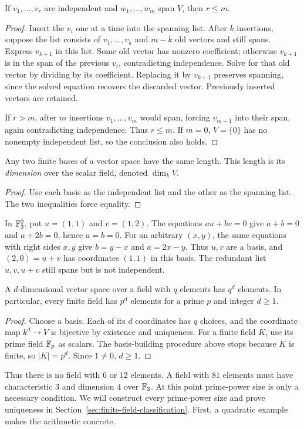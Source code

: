 \begin{lemma}[Exchange]
If $v_1,\ldots,v_r$ are independent and $w_1,\ldots,w_m$ span $V$,
then $r\le m$.
\end{lemma}
\begin{proof}
Insert the $v_i$ one at a time into the spanning list. After $k$
insertions, suppose the list consists of $v_1,\ldots,v_k$ and $m-k$
old vectors and still spans. Express $v_{k+1}$ in this list. Some old
vector has nonzero coefficient; otherwise $v_{k+1}$ is in the span of
the previous $v_i$, contradicting independence. Solve for that old
vector by dividing by its coefficient. Replacing it by $v_{k+1}$
preserves spanning, since the solved equation recovers the discarded
vector. Previously inserted vectors are retained.

If $r>m$, after $m$ insertions $v_1,\ldots,v_m$ would span, forcing
$v_{m+1}$ into their span, again contradicting independence. Thus
$r\le m$. If $m=0$, $V=\{0\}$ has no nonempty independent list,
so the conclusion also holds.
\end{proof}

\begin{corollary}
Any two finite bases of a vector space have the same length. This length
is its \emph{dimension} over the scalar field, denoted $\dim_kV$.
\end{corollary}
\begin{proof}
Use each basis as the independent list and the other as the spanning
list. The two inequalities force equality.
\end{proof}

\begin{example}
In $\mathbb F_3^2$, put $u=(1,1)$ and $v=(1,2)$. The equations
$au+bv=0$ give $a+b=0$ and $a+2b=0$, hence $a=b=0$.
For an arbitrary $(x,y)$, the same equations with right sides $x,y$
give $b=y-x$ and $a=2x-y$. Thus $u,v$ are a basis, and
$(2,0)=u+v$ has coordinates $(1,1)$ in this basis.
The redundant list $u,v,u+v$ still spans but is not independent.
\end{example}

\begin{theorem}
\label{thm:finite-field-size}
A $d$-dimensional vector space over a field with $q$ elements has $q^d$
elements. In particular, every finite field has $p^d$ elements for a
prime $p$ and integer $d\ge1$.
\end{theorem}
\begin{proof}
Choose a basis. Each of its $d$ coordinates has $q$ choices, and the
coordinate map $k^d\to V$ is bijective by existence and uniqueness.
For a finite field $K$, use its prime field $\mathbb F_p$ as scalars. The
basis-building procedure above stops because $K$ is finite, so
$|K|=p^d$. Since $1\ne0$, $d\ge1$.
\end{proof}

Thus there is no field with $6$ or $12$ elements. A field with $81$
elements must have characteristic $3$ and dimension $4$ over $\mathbb F_3$.
At this point prime-power size is only a necessary condition. We will
construct every prime-power size and prove uniqueness in
Section~\ref{sec:finite-field-classification}. First, a quadratic example
makes the arithmetic concrete.
